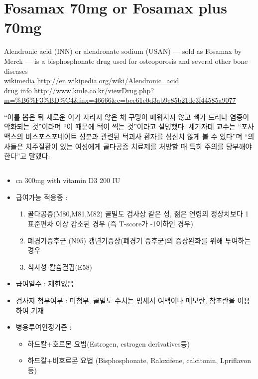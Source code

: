 \section{Fosamax 70mg or Fosamax plus 70mg}
Alendronic acid (INN) or alendronate sodium (USAN) — sold as Fosamax by Merck — is a bisphosphonate drug used for osteoporosis and several other bone diseases\\


\href{http://en.wikipedia.org/wiki/Alendronic_acid}{wikimedia} \url{http://en.wikipedia.org/wiki/Alendronic_acid}\\ 
\href{http://www.kmle.co.kr/viewDrug.php?m=%B6%F3%BD%C4&inx=46666&c=bce61e0d3ab9c85b21de3f44585a9077}{drug info} \url{http://www.kmle.co.kr/viewDrug.php?m=%B6%F3%BD%C4&inx=46666&c=bce61e0d3ab9c85b21de3f44585a9077}
\begin{shaded}
 “이를 뽑은 뒤 새로운 이가 자라지 않은 채 구멍이 매워지지 않고 뼈가 드러나 염증이 악화되는 것”이라며 “이 때문에 턱이 썩는 것”이라고 설명했다.
세기자데 교수는 “포사맥스의 비스포스포네이트 성분과 관련된 턱괴사 환자를 심심치 않게 볼 수 있다”며 “의사들은 치주질환이 있는 여성에게 골다공증 치료제를 처방할 때 특히 주의를 당부해야 한다”고 말했다.
\end{shaded}
\subsection{}
\begin{itemize}\tightlist
\item ca 300mg with vitamin D3 200 IU
\item 급여가능 적응증 : 
	\begin{enumerate}[1.]\tightlist
	\item 골다공증(M80,M81,M82) 골밀도 검사상 같은 성, 젊은 연령의 정상치보다 1표준편차 이상 감소된 경우 (즉 T-score가 -1이하인 경우) 
	\item 폐경기증후군 (N95) 갱년기증상(폐경기 증후군)의 증상완화를 위해 투여하는 경우 
	\item 식사성 칼슘결핍(E58)
	\end{enumerate}
\item 급여일수 : 제한없음
\item 검사지 첨부여부 : 미첨부, 골밀도 수치는 명세서 여백이나 메모란, 참조란을 이용하여 기재
\item 병용투여인정기준 :
	\begin{itemize}\tightlist
	\item 하드칼+호르몬 요법(Estrogen, estrogen derivatives등) 
	\item 하드칼+비호르몬 요법 (Bisphosphonate, Raloxifene, calcitonin, Lpriflavon등)
	\end{itemize}
\end{itemize}

